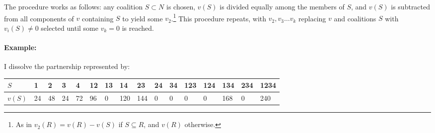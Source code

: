 \documentclass[12pt]{article}
\begin{document}
The procedure works as follows: any coalition $S\subset N$ is chosen, $v(S)$
is divided equally among the members of $S$, and $v(S)$ is subtracted from all
components of $v$ containing $S$ to yield some $v_2$.\footnote{As in $v_2(R) =
  v(R)-v(S)$ if $S \subseteq R$, and $v(R)$ otherwise.} This procedure repeats,
with $v_2, v_3\ldots v_k$ replacing $v$ and coalitions $S$ with $v_i(S)\neq 0$
selected until some $v_k = 0$ is reached.

\paragraph{Example:}
I dissolve the partnership represented by:
\begin{table}[h]
\centering
\begin{tabular}{|l|l|l|l|l|l|l|l|l|l|l|l|l|l|l|l|}
\hline
$S$  & 1  & 2  & 3  & 4  & 12 & 13 & 14  & 23  & 24 & 34 & 123 & 124 & 134 & 234 & 1234 \\ \hline
$v(S)$& 24 & 48 & 24 & 72 & 96 & 0  & 120 & 144 & 0  & 0  & 0   & 0   & 168 & 0   & 240  \\ \hline
\end{tabular}
\end{table}
\end{document}
